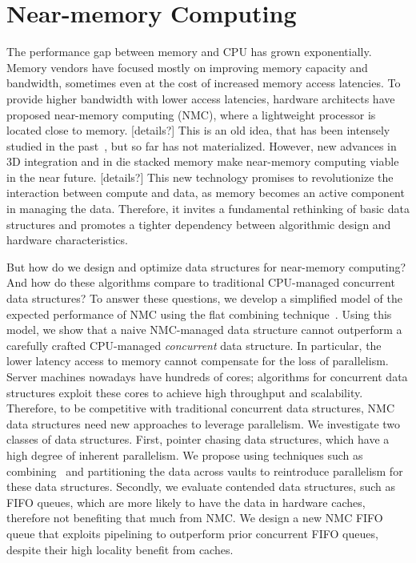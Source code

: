\section{Near-memory Computing}

The performance gap between memory and CPU has grown exponentially. Memory vendors have focused mostly on improving memory capacity and bandwidth, sometimes even at the cost of increased memory access latencies. To provide higher bandwidth with lower access latencies, hardware architects have proposed near-memory computing (NMC), where a lightweight processor is located close to memory. [details?] This is an old idea, that has been intensely studied in the past~\cite{}, but so far has not materialized. However, new advances in 3D integration and in die stacked memory make near-memory computing viable in the near future. [details?] This new technology promises to revolutionize the interaction between compute and data, as memory becomes an active component in managing the data. Therefore, it invites a fundamental rethinking of basic data structures and promotes a tighter dependency between algorithmic design and hardware characteristics. 

But how do we design and optimize data structures for near-memory computing? And how do these algorithms compare to traditional CPU-managed concurrent data structures? To answer these questions, we develop a simplified model of the expected performance of NMC using the flat combining technique~\cite{}. Using this model, we show that a naive NMC-managed data structure cannot outperform a carefully crafted CPU-managed \emph{concurrent} data structure. In particular, the lower latency access to memory cannot compensate for the loss of parallelism. Server machines nowadays have hundreds of cores; algorithms for concurrent data structures exploit these cores to achieve high throughput and scalability. Therefore, to be competitive with traditional concurrent data structures, NMC data structures need new approaches to leverage parallelism. We investigate two classes of data structures. First, pointer chasing data structures, which have a high degree of inherent parallelism. We propose using techniques such as combining~\cite{} and partitioning the data across vaults to reintroduce parallelism for these data structures. Secondly, we evaluate contended data structures, such as FIFO queues, which are more likely to have the data in hardware caches, therefore not benefiting that much from NMC. We design a new NMC FIFO queue that exploits pipelining to outperform prior concurrent FIFO queues, despite their high locality benefit from caches. 

